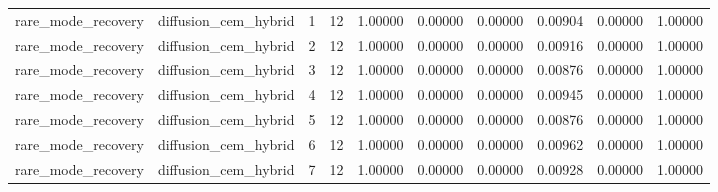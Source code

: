 \documentclass{article}
\begin{document}
\begin{table}[tbp]
{\begin{tabular}{llllllllll}
rare\_mode\_recovery & diffusion\_cem\_hybrid & 1 & 12 & 1.00000 & 0.00000 & 0.00000 & 0.00904 & 0.00000 & 1.00000 \\
rare\_mode\_recovery & diffusion\_cem\_hybrid & 2 & 12 & 1.00000 & 0.00000 & 0.00000 & 0.00916 & 0.00000 & 1.00000 \\
rare\_mode\_recovery & diffusion\_cem\_hybrid & 3 & 12 & 1.00000 & 0.00000 & 0.00000 & 0.00876 & 0.00000 & 1.00000 \\
rare\_mode\_recovery & diffusion\_cem\_hybrid & 4 & 12 & 1.00000 & 0.00000 & 0.00000 & 0.00945 & 0.00000 & 1.00000 \\
rare\_mode\_recovery & diffusion\_cem\_hybrid & 5 & 12 & 1.00000 & 0.00000 & 0.00000 & 0.00876 & 0.00000 & 1.00000 \\
rare\_mode\_recovery & diffusion\_cem\_hybrid & 6 & 12 & 1.00000 & 0.00000 & 0.00000 & 0.00962 & 0.00000 & 1.00000 \\
rare\_mode\_recovery & diffusion\_cem\_hybrid & 7 & 12 & 1.00000 & 0.00000 & 0.00000 & 0.00928 & 0.00000 & 1.00000 \\
\bottomrule
\end{tabular}
}
\end{table}

\clearpage
\end{document}
